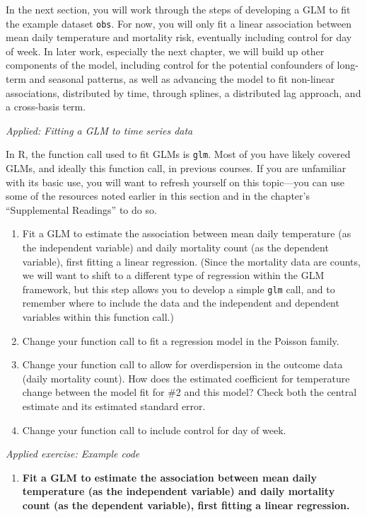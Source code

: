 \documentclass[
]{book}
\providecommand{\tightlist}{%
  \setlength{\itemsep}{0pt}\setlength{\parskip}{0pt}}
\begin{document}
In the next section, you will work through the steps of developing a GLM to fit
the example dataset \texttt{obs}. For now, you will only fit a linear association
between mean daily temperature and mortality risk, eventually including control
for day of week. In later work, especially the next chapter, we will build up
other components of the model, including control for the potential confounders
of long-term and seasonal patterns, as well as advancing the model to fit
non-linear associations, distributed by time, through splines, a distributed lag
approach, and a cross-basis term.

\emph{Applied: Fitting a GLM to time series data}

In R, the function call used to fit GLMs is \texttt{glm}. Most of you have likely
covered GLMs, and ideally this function call, in previous courses. If you are
unfamiliar with its basic use, you will want to refresh yourself on this
topic---you can use some of the resources noted earlier in this section and in
the chapter's ``Supplemental Readings'' to do so.

\begin{enumerate}
\def\labelenumi{\arabic{enumi}.}
\tightlist
\item
  Fit a GLM to estimate the association between mean daily temperature (as the
  independent variable) and daily mortality count (as the dependent variable),
  first fitting a linear regression. (Since the mortality data are counts, we will
  want to shift to a different type of regression within the GLM framework, but
  this step allows you to develop a simple \texttt{glm} call, and to remember where to
  include the data and the independent and dependent variables within this
  function call.)
\item
  Change your function call to fit a regression model in the Poisson family.
\item
  Change your function call to allow for overdispersion in the outcome data
  (daily mortality count). How does the estimated coefficient for temperature
  change between the model fit for \#2 and this model? Check both the central
  estimate and its estimated standard error.
\item
  Change your function call to include control for day of week.
\end{enumerate}

\emph{Applied exercise: Example code}

\begin{enumerate}
\def\labelenumi{\arabic{enumi}.}
\tightlist
\item
  \textbf{Fit a GLM to estimate the association between mean daily temperature (as the
  independent variable) and daily mortality count (as the dependent variable),
  first fitting a linear regression.}
\end{enumerate}
\end{document}
